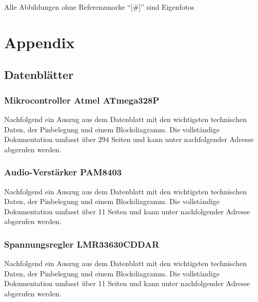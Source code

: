 \documentclass[a4paper, twoside, 12pt, openright
]{memoir}
\newcommand{\AndreasGrain}{Andreas Grain}
\newcommand{\MatthiasMair}{Matthias Mair}
\newcommand{\authorName}{\AndreasGrain\ / \MatthiasMair}
\begin{document}
\cleartoverso

\renewcommand{\authorName}{\AndreasGrain\ / \MatthiasMair}
\appendix
\printbibliography[title={Literatur und Quellen}]\clearpage
\printacronyms[heading=chapter*,name=Abkürzungen]\clearpage
\listoffigures
Alle Abbildungen ohne Referenzmarke \enquote{[\#]} sind Eigenfotos\clearpage
\listoftables
\clearpage

\part{Appendix}
\chapter{Datenblätter}
\section{Mikrocontroller Atmel ATmega328P}
Nachfolgend ein Auszug aus dem Datenblatt mit den wichtigsten technischen Daten, der Pinbelegung und einem Blockdiagramm. Die vollständige Dokumentation umfasst über 294 Seiten und kann unter nachfolgender Adresse abgerufen werden.\par
{}
\section{Audio-Verstärker PAM8403}
Nachfolgend ein Auszug aus dem Datenblatt mit den wichtigsten technischen Daten, der Pinbelegung und einem Blockdiagramm. Die vollständige Dokumentation umfasst über 11 Seiten und kann unter nachfolgender Adresse abgerufen werden.\par
{}

\section{Spannungsregler LMR33630CDDAR}
Nachfolgend ein Auszug aus dem Datenblatt mit den wichtigsten technischen Daten, der Pinbelegung und einem Blockdiagramm. Die vollständige Dokumentation umfasst über 11 Seiten und kann unter nachfolgender Adresse abgerufen werden.\par
{}

\end{document}
